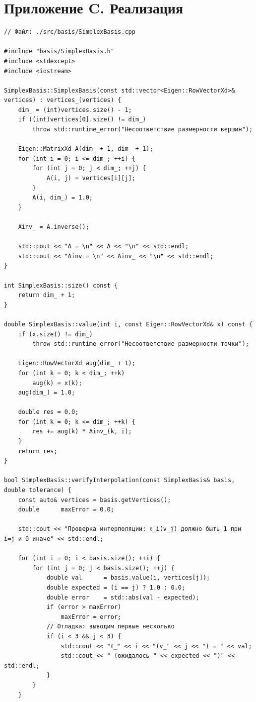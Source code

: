 \documentclass[appendix_C]{subfiles}
\begin{document}
\section*{Приложение C. Реализация}

\begin{lstlisting}
// Файл: ./src/basis/SimplexBasis.cpp

#include "basis/SimplexBasis.h"
#include <stdexcept>
#include <iostream>

SimplexBasis::SimplexBasis(const std::vector<Eigen::RowVectorXd>& vertices) : vertices_(vertices) {
    dim_ = (int)vertices.size() - 1;
    if ((int)vertices[0].size() != dim_)
        throw std::runtime_error("Несоответствие размерности вершин");

    Eigen::MatrixXd A(dim_ + 1, dim_ + 1);
    for (int i = 0; i <= dim_; ++i) {
        for (int j = 0; j < dim_; ++j) {
            A(i, j) = vertices[i][j];
        }
        A(i, dim_) = 1.0;
    }

    Ainv_ = A.inverse();

    std::cout << "A = \n" << A << "\n" << std::endl;
    std::cout << "Ainv = \n" << Ainv_ << "\n" << std::endl;
}

int SimplexBasis::size() const {
    return dim_ + 1;
}

double SimplexBasis::value(int i, const Eigen::RowVectorXd& x) const {
    if (x.size() != dim_)
        throw std::runtime_error("Несоответствие размерности точки");

    Eigen::RowVectorXd aug(dim_ + 1);
    for (int k = 0; k < dim_; ++k)
        aug(k) = x(k);
    aug(dim_) = 1.0;

    double res = 0.0;
    for (int k = 0; k <= dim_; ++k) {
        res += aug(k) * Ainv_(k, i);
    }
    return res;
}

bool SimplexBasis::verifyInterpolation(const SimplexBasis& basis, double tolerance) {
    const auto& vertices = basis.getVertices();
    double      maxError = 0.0;

    std::cout << "Проверка интерполяции: ℓ_i(v_j) должно быть 1 при i=j и 0 иначе" << std::endl;

    for (int i = 0; i < basis.size(); ++i) {
        for (int j = 0; j < basis.size(); ++j) {
            double val      = basis.value(i, vertices[j]);
            double expected = (i == j) ? 1.0 : 0.0;
            double error    = std::abs(val - expected);
            if (error > maxError)
                maxError = error;
            // Отладка: выводим первые несколько
            if (i < 3 && j < 3) {
                std::cout << "ℓ_" << i << "(v_" << j << ") = " << val;
                std::cout << " (ожидалось " << expected << ")" << std::endl;
            }
        }
    }


\end{lstlisting}
\end{document}
